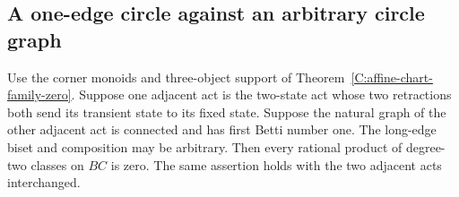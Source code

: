 \subsection{A one-edge circle against an arbitrary circle graph}

\begin{theorem}
\label{C:one-edge-circle-chart-zero}
Use the corner monoids and three-object support of
Theorem~\ref{C:affine-chart-family-zero}.  Suppose one adjacent
act is the two-state act whose two retractions both send its
transient state to its fixed state.  Suppose the natural graph
of the other adjacent act is connected and has first Betti
number one.  The long-edge biset and composition may be arbitrary.
Then every rational product of degree-two classes on $BC$ is
zero.  The same assertion holds with the two adjacent acts
interchanged.
\end{theorem}
